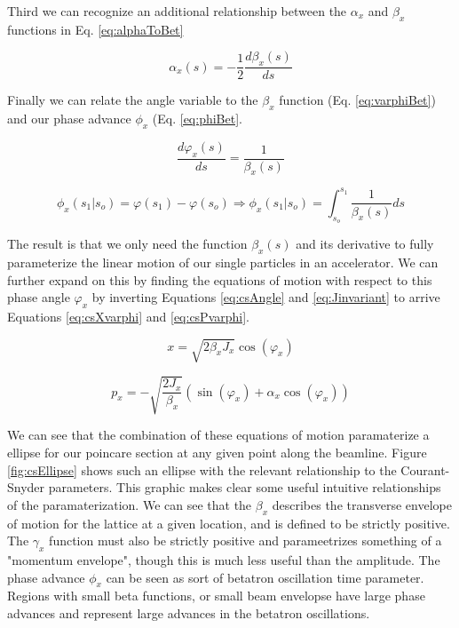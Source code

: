 Third we can recognize an additional relationship between the $\alpha_x$ and $\beta_x$ functions in Eq. \ref{eq:alphaToBet}

\begin{equation} \label{eq:alphaToBet}
	\alpha_x(s) = -\frac{1}{2}\frac{d\beta_x(s)}{ds}
\end{equation}

Finally we can relate the angle variable to the $\beta_x$ function (Eq. \ref{eq:varphiBet}) and our phase advance $\phi_x$ (Eq. \ref{eq:phiBet}.

\begin{equation} \label{eq:varphiBet}
	\frac{d\varphi_x(s)}{ds} = \frac{1}{\beta_x(s)}
\end{equation}

\begin{equation} \label{eq:phiBet}
	\phi_x(s_1|s_o) = \varphi(s_1) - \varphi(s_o) \Rightarrow \phi_x(s_1|s_o) = \int_{s_o}^{s_1} \frac{1}{\beta_x(s)} ds
\end{equation}

The result is that we only need the function $\beta_x(s)$ and its derivative to fully parameterize the linear motion of our single particles in an accelerator. We can further expand on this by finding the equations of motion with respect to this phase angle $\varphi_x$ by inverting Equations \ref{eq:csAngle} and \ref{eq:Jinvariant} to arrive Equations \ref{eq:csXvarphi} and \ref{eq:csPvarphi}.

\begin{equation} \label{eq:csXvarphi}
	x = \sqrt{2 \beta_x J_x} \cos{(\varphi_x)}
\end{equation}

\begin{equation} \label{eq:csPvarphi}
	p_x = -\sqrt{\frac{2 J_x}{\beta_x}} (\sin{(\varphi_x)} + \alpha_x \cos{(\varphi_x)})
\end{equation}

We can see that the combination of these equations of motion paramaterize a ellipse for our poincare section at any given point along the beamline. Figure \ref{fig:csEllipse} shows such an ellipse with the relevant relationship to the Courant-Snyder parameters. This graphic makes clear some useful intuitive relationships of the paramaterization. We can see that the $\beta_x$ describes the transverse envelope of motion for the lattice at a given location, and is defined to be strictly positive. The $\gamma_x$ function must also be strictly positive and parameetrizes something of a "momentum envelope", though this is much less useful than the amplitude. The phase advance $\phi_x$ can be seen as sort of betatron oscillation time parameter. Regions with small beta functions, or small beam envelopse have large phase advances and represent large advances in the betatron oscillations.

